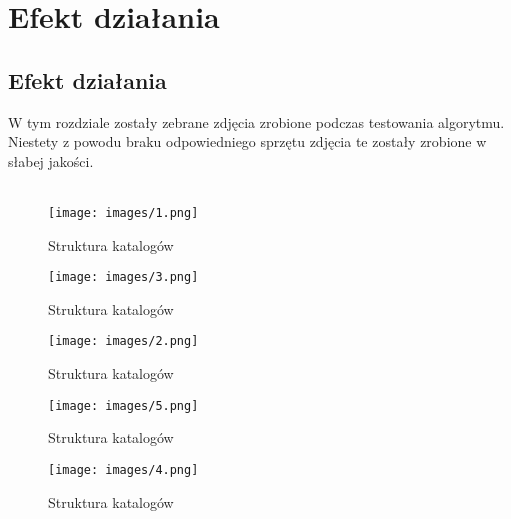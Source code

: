 \chapter{Efekt działania}
\label{cha:efekt}



\section{Efekt działania}
W tym rozdziale zostały zebrane zdjęcia zrobione podczas testowania algorytmu. Niestety z powodu braku odpowiedniego sprzętu zdjęcia te zostały zrobione w słabej jakości. \\ \\ 
\begin{figure}[tbph!]
\centering
\texttt{[image: images/1.png]}
\caption{Struktura katalogów}
\label{fig:tree}
\end{figure}
\begin{figure}[tbph!]
\centering
\texttt{[image: images/3.png]}
\caption{Struktura katalogów}
\label{fig:tree}
\end{figure}
\begin{figure}[tbph!]
\centering
\texttt{[image: images/2.png]}
\caption{Struktura katalogów}
\label{fig:tree}
\end{figure}
\begin{figure}[tbph!]
\centering
\texttt{[image: images/5.png]}
\caption{Struktura katalogów}
\label{fig:tree}
\end{figure}
\begin{figure}[tbph!]
\centering
\texttt{[image: images/4.png]}
\caption{Struktura katalogów}
\label{fig:tree}
\end{figure}

